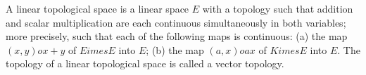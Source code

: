 A linear topological space is a linear space $E$ with a topology such that addition and scalar multiplication are each continuous simultaneously in both variables; more precisely, such that each of the following maps is continuous: (a) the map $(x,y) 	o x + y$ of $E 	imes E$ into $E$; (b) the map $(a,x) 	o ax$ of $K 	imes E$ into $E$. The topology of a linear topological space is called a vector topology.
